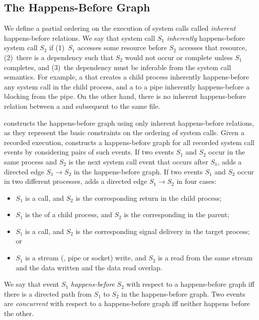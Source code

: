 \subsection{The Happens-Before Graph} \label{racepro:sec:graph}

We define a partial ordering on the execution of system calls called
\emph{inherent} happens-before relations.  We say that system call
$S_1$ \emph{inherently} happens-before system call $S_2$ if (1)~$S_1$
accesses some resource before $S_2$ accesses that resource, (2)~there
is a dependency such that $S_2$ would not occur or complete unless
$S_1$ completes, and (3)~the dependency must be inferable from the
system call semantics.  For example, a  that creates a child
process inherently happens-before any system call in the child
process, and a  to a pipe inherently happens-before 
a blocking  from the pipe.  On the other hand, there is no
inherent happens-before relation between a  and subsequent 
 to the same file.

\racepro constructs the happens-before graph using only inherent
happens-before relations, as they represent the basic constraints on
the ordering of system calls.  Given a recorded
execution, \racepro constructs a happens-before graph for all recorded
system call events by considering pairs of such events.  If two events
$S_1$ and $S_2$ occur in the same process and $S_2$ is the next
system call event that occurs after $S_1$, \racepro adds a directed edge
$S_1\rightarrow S_2$ in the happens-before graph.  If two events $S_1$
and $S_2$ occur in two different processes, \racepro adds a directed edge
$S_1\rightarrow S_2$ in four cases: 

\begin{itemize}
\item $S_1$ is a  call, and $S_2$ is the corresponding
   return in the child process;
\item $S_1$ is the  of a child process, and $S_2$ is the
  corresponding  in the parent;
\item $S_1$ is a  call, and $S_2$ is the corresponding signal
  delivery in the target process; or
\item $S_1$ is a stream (\eg, pipe or socket) write, and $S_2$ is a
  read from the same stream and the data written and the data read
  overlap.
\end{itemize}

We say that event $S_1$ \emph{happens-before} $S_2$ with respect to a
happens-before graph iff there is a directed path from $S_1$ to
$S_2$ in the happens-before graph.  Two events are \emph{concurrent}
with respect to a happens-before graph iff neither happens before
the other. 

